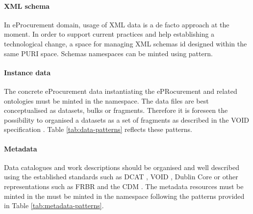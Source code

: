 	\paragraph{XML schema} In eProcurement domain, usage of XML data is a de facto approach at the moment. In order to support current practices and help establishing a technological change, a space for managing XML schemas id designed within the same PURI space. Schemas namespaces can be minted using  pattern. 
	
	\begin{table}[!htb]
		\centering
		\caption{URI patterns for the instance data namespace}
		\label{tab:data-patterns}
	\end{table}
	
	\paragraph{Instance data} The concrete eProcurement data instantiating the ePRocurement and related ontologies must be minted in the  namespace. The data files are best conceptualised as datasets, bulks or fragments. Therefore it is foreseen the possibility to organised a datasets as a set of fragments as described in the VOID specification \cite{void-spec}. Table \ref{tab:data-patterns} reflects these patterns. 
	
	
	
	\paragraph{Metadata} Data catalogues and work descriptions should be organised and well described using the established standards such as DCAT \citep{dcat2}, VOID \cite{void-spec}, Dublin Core \cite{dublin-core-metadata} or other representations such as FRBR \cite{frbr-ifla1998} and the CDM \cite{cdm-francesconi2015semantic,cdm-francesconi2015ontology}. The metadata resources must be minted in the must be minted in the  namespace following the patterns provided in Table \ref{tab:metadata-patterns}.
	
